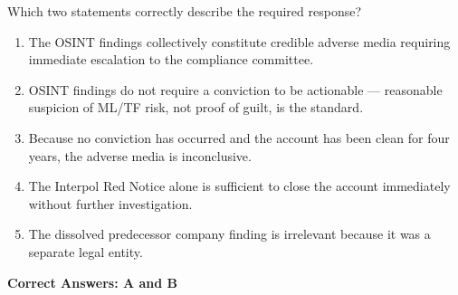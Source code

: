 \documentclass[11pt,a4paper]{article}
\begin{document}
	Which two statements correctly describe the required response?
	
	\begin{enumerate}[label=\Alph*.]
		\item The OSINT findings collectively constitute credible adverse media requiring immediate escalation to the compliance committee.
		\item OSINT findings do not require a conviction to be actionable — reasonable suspicion of ML/TF risk, not proof of guilt, is the standard.
		\item Because no conviction has occurred and the account has been clean for four years, the adverse media is inconclusive.
		\item The Interpol Red Notice alone is sufficient to close the account immediately without further investigation.
		\item The dissolved predecessor company finding is irrelevant because it was a separate legal entity.
	\end{enumerate}
	
	\textbf{Correct Answers: A and B}
	
\end{document}
